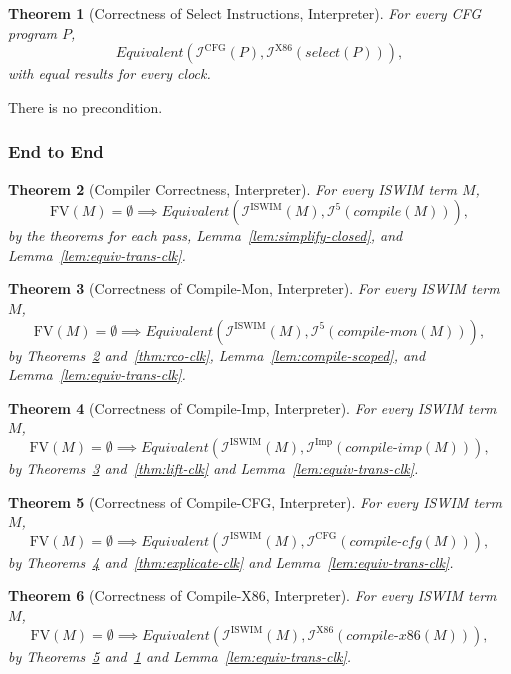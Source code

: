 \documentclass[10pt]{article}
\theoremstyle{acmplain}
\newtheorem{theorem}{Theorem}[section]
\newcommand{\pass}[1]{\mathit{#1}}
\newcommand{\FV}{\mathrm{FV}}
\newcommand{\Equiv}{\mathit{Equivalent}}
\newcommand{\Interp}[1]{\mathcal{I}^{#1}}
\begin{document}
\begin{theorem}[Correctness of Select Instructions, Interpreter]\label{thm:select-clk}
For every CFG program $P$,
\[
  \Equiv(\Interp{\mathrm{CFG}}(P), \Interp{\mathrm{X86}}(\pass{select}(P))) ,
\]
with equal results for every clock.
\end{theorem}
There is no precondition.

\subsubsection{End to End}

\begin{theorem}[Compiler Correctness, Interpreter]\label{thm:compiler-clk}
For every ISWIM term $M$,
\[
  \FV(M) = \emptyset \implies \Equiv(\Interp{\mathrm{ISWIM}}(M), \Interp{5}(\pass{compile}(M))) ,
\]
by the theorems for each pass, Lemma~\ref{lem:simplify-closed}, and Lemma~\ref{lem:equiv-trans-clk}.
\end{theorem}

\begin{theorem}[Correctness of Compile-Mon, Interpreter]\label{thm:compile-mon-clk}
For every ISWIM term $M$,
\[
  \FV(M) = \emptyset \implies \Equiv(\Interp{\mathrm{ISWIM}}(M), \Interp{5}(\pass{compile\text{-}mon}(M))) ,
\]
by Theorems~\ref{thm:compiler-clk} and~\ref{thm:rco-clk}, Lemma~\ref{lem:compile-scoped},
and Lemma~\ref{lem:equiv-trans-clk}.
\end{theorem}

\begin{theorem}[Correctness of Compile-Imp, Interpreter]\label{thm:compile-imp-clk}
For every ISWIM term $M$,
\[
  \FV(M) = \emptyset \implies \Equiv(\Interp{\mathrm{ISWIM}}(M), \Interp{\mathrm{Imp}}(\pass{compile\text{-}imp}(M))) ,
\]
by Theorems~\ref{thm:compile-mon-clk} and~\ref{thm:lift-clk} and Lemma~\ref{lem:equiv-trans-clk}.
\end{theorem}

\begin{theorem}[Correctness of Compile-CFG, Interpreter]\label{thm:compile-cfg-clk}
For every ISWIM term $M$,
\[
  \FV(M) = \emptyset \implies \Equiv(\Interp{\mathrm{ISWIM}}(M), \Interp{\mathrm{CFG}}(\pass{compile\text{-}cfg}(M))) ,
\]
by Theorems~\ref{thm:compile-imp-clk} and~\ref{thm:explicate-clk} and Lemma~\ref{lem:equiv-trans-clk}.
\end{theorem}

\begin{theorem}[Correctness of Compile-X86, Interpreter]\label{thm:compile-x86-clk}
For every ISWIM term $M$,
\[
  \FV(M) = \emptyset \implies \Equiv(\Interp{\mathrm{ISWIM}}(M), \Interp{\mathrm{X86}}(\pass{compile\text{-}x86}(M))) ,
\]
by Theorems~\ref{thm:compile-cfg-clk} and~\ref{thm:select-clk} and Lemma~\ref{lem:equiv-trans-clk}.
\end{theorem}
\end{document}
